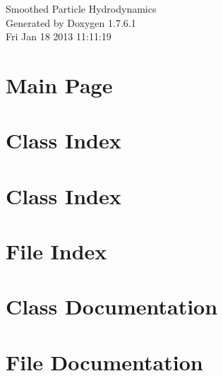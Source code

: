 \documentclass[a4paper]{book}
\begin{document}
\hypersetup{pageanchor=false,citecolor=blue}
\begin{titlepage}
\vspace*{7cm}
\begin{center}
{\Large \-Smoothed \-Particle \-Hydrodynamics }\\
\vspace*{1cm}
{\large \-Generated by Doxygen 1.7.6.1}\\
\vspace*{0.5cm}
{\small Fri Jan 18 2013 11:11:19}\\
\end{center}
\end{titlepage}
\clearemptydoublepage
{}
\tableofcontents
\clearemptydoublepage
{}
\hypersetup{pageanchor=true,citecolor=blue}
\chapter{\-Main \-Page}
\label{index}\hypertarget{index}{}
\chapter{\-Class \-Index}

\chapter{\-Class \-Index}

\chapter{\-File \-Index}

\chapter{\-Class \-Documentation}















\chapter{\-File \-Documentation}























\printindex
\end{document}
